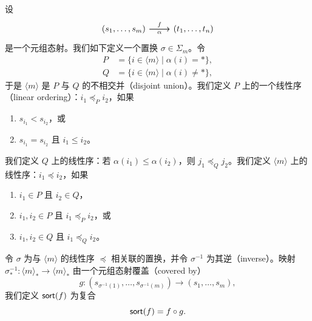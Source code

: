 \begin{construction}\label{sortofmorphisminC}
    设
    \[ \begin{tikzcd} 
    (s_1,\dots,s_m) \ar[r,"f"] \ar[r,swap,"\alpha"] &  (t_1,\dots,t_n)
    \end{tikzcd}\]
    是一个元组态射。我们如下定义一个置换 $\sigma \in \Sigma_m$。令
    \begin{align*} P & = \{i \in \langle m \rangle \mid \alpha(i) = *\},\\
Q & = \{ i \in \langle m \rangle \mid \alpha(i) \neq *\},
    \end{align*}
    于是 $\langle m \rangle$ 是 $P$ 与 $Q$ 的不相交并（disjoint union）。我们定义 $P$ 上的一个线性序（linear ordering）：$i_1 \preceq_P i_2$，如果
    \begin{enumerate} 
    \item $s_{i_1} < s_{i_2}$，或 
    \item $s_{i_1} = s_{i_2}$ 且 $i_1 \leq i_2$。
    \end{enumerate}
    我们定义 $Q$ 上的线性序：若 $\alpha(i_1) \leq \alpha(i_2)$，则 $j_1 \preceq_Q j_2$。我们定义 $\langle m \rangle$ 上的线性序：$i_1 \preceq i_2$，如果
    \begin{enumerate} 
    \item $i_1 \in P$ 且 $i_2 \in Q$，
    \item $i_1,i_2 \in P$ 且 $i_1 \preceq_P i_2$，或 
    \item $i_1,i_2 \in Q$ 且 $i_1 \preceq_Q i_2$。 
    \end{enumerate}
    令 $\sigma$ 为与 $\langle m \rangle$ 的线性序 $\preceq$ 相关联的置换，并令 $\sigma^{-1}$ 为其逆（inverse）。映射 $\sigma^{-1}_*:\langle m \rangle_* \to \langle m \rangle_*$ 由一个元组态射覆盖（covered by）
    \[
    g: (s_{\sigma^{-1}(1)},\dots,s_{\sigma^{-1}(m)}) \to (s_1,\dots,s_m),
    \]
    我们定义 $\mathsf{sort}(f)$ 为复合
    \[
    \mathsf{sort}(f) = f \circ g.
    \]
\end{construction}

